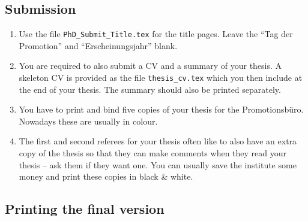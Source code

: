 \subsection{Submission}

\begin{enumerate}
\item Use the file \texttt{PhD\_Submit\_Title.tex} for the title
  pages. Leave the \foreignquote{ngerman}{Tag der Promotion} and
  \foreignquote{ngerman}{Erscheinungsjahr} blank.
\item You are required to also submit a CV and a summary of your
  thesis. A skeleton CV is provided as the file
  \texttt{thesis\_cv.tex} which you then include at the end of your
  thesis. The summary should also be printed separately.
\item You have to print and bind five copies of your thesis for the
  \foreignlanguage{ngerman}{Promotionsbüro}. Nowadays these are
  usually in colour.
\item The first and second referees for your thesis often like to also
  have an extra copy of the thesis so that they can make comments when they read
  your thesis -- ask them if they want one. You can usually save the
  institute some money and print these copies in black \& white.
\end{enumerate}


\subsection{Printing the final version}


